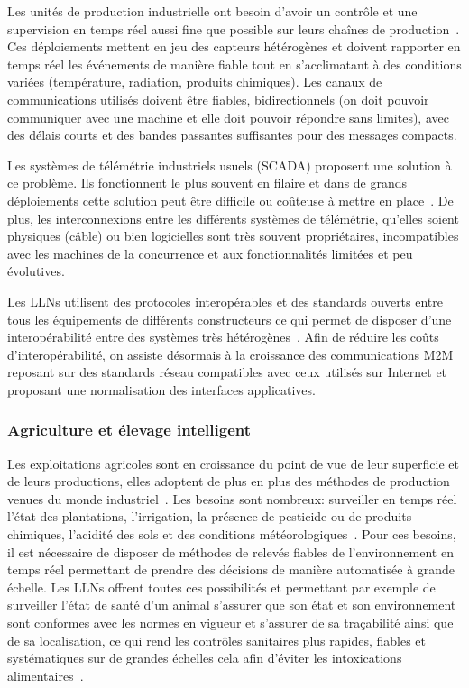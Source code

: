 Les unités de production industrielle ont besoin d'avoir un contrôle et une supervision en temps réel aussi fine que possible sur leurs chaînes de production~\cite{erol2011wireless, gungor2010opportunities}.
Ces déploiements mettent en jeu des capteurs hétérogènes et doivent rapporter en temps réel les événements de manière fiable tout en s'acclimatant à des conditions variées (température, radiation, produits chimiques).
Les canaux de communications utilisés doivent être fiables, bidirectionnels (on doit pouvoir communiquer avec une machine et elle doit pouvoir répondre sans limites), avec des délais courts et des bandes passantes suffisantes pour des messages compacts.

Les systèmes de télémétrie industriels usuels (\ac{SCADA}) proposent une solution à ce problème.
Ils fonctionnent le plus souvent en filaire et dans de grands déploiements cette solution peut être difficile ou coûteuse à mettre en place~\cite{anton2014machine}.
De plus, les interconnexions entre les différents systèmes de télémétrie, qu'elles soient physiques (câble) ou bien logicielles sont très souvent propriétaires, incompatibles avec les machines de la concurrence et aux fonctionnalités limitées et peu évolutives.

Les \ac{LLN}s utilisent des protocoles interopérables et des standards ouverts entre tous les équipements de différents constructeurs ce qui permet de disposer d'une interopérabilité entre des systèmes très hétérogènes~\cite{shelby20116lowpan, walter2009implementing}.
Afin de réduire les coûts d'interopérabilité, on assiste désormais à la croissance des communications \ac{M2M} reposant sur des standards réseau compatibles avec ceux utilisés sur Internet et proposant une normalisation des interfaces applicatives.

\subsubsection{Agriculture et élevage intelligent}

Les exploitations agricoles sont en croissance du point de vue de leur superficie et de leurs productions, elles adoptent de plus en plus des méthodes de production venues du monde industriel~\cite{ruiz2009review}.
Les besoins sont nombreux: surveiller en temps réel l'état des plantations, l’irrigation, la présence de pesticide ou de produits chimiques, l'acidité des sols et des conditions météorologiques~\cite{wark2007transforming}.
Pour ces besoins, il est nécessaire de disposer de méthodes de relevés fiables de l'environnement en temps réel permettant de prendre des décisions de manière automatisée à grande échelle.
Les \ac{LLN}s offrent toutes ces possibilités et permettant par exemple de surveiller l'état de santé d'un animal s'assurer que son état et son environnement sont conformes avec les normes en vigueur et s'assurer de sa traçabilité ainsi que de sa localisation, ce qui rend les contrôles sanitaires plus rapides, fiables et systématiques sur de grandes échelles cela afin d'éviter les intoxications alimentaires~\cite{wang2006wireless}.

